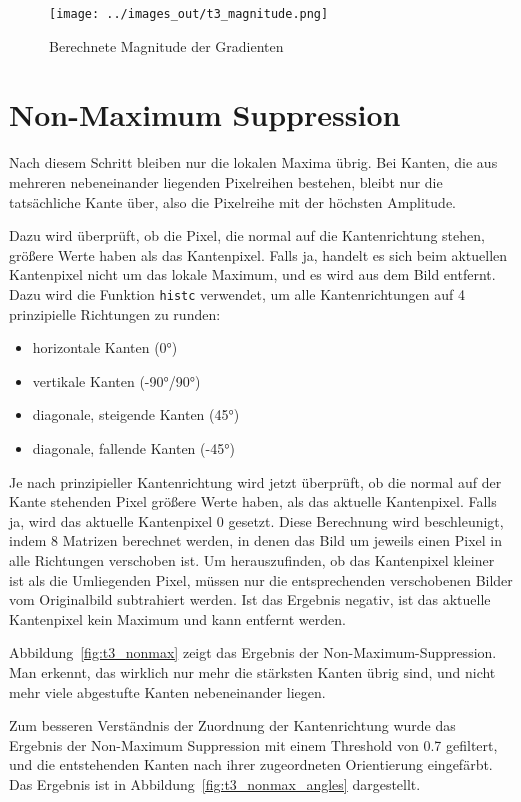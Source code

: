 \begin{figure}[htb]
 \centering
 \texttt{[image: ../images\_out/t3\_magnitude.png]}
 \caption{Berechnete Magnitude der Gradienten}
 \label{fig:t3_magnitude}
\end{figure}

\clearpage

\section{Non-Maximum Suppression}

Nach diesem Schritt bleiben nur die lokalen Maxima übrig. Bei Kanten, die aus mehreren nebeneinander liegenden Pixelreihen bestehen, bleibt nur die tatsächliche Kante über, also die Pixelreihe mit der höchsten Amplitude.

Dazu wird überprüft, ob die Pixel, die normal auf die Kantenrichtung stehen, größere Werte haben als das Kantenpixel. Falls ja, handelt es sich beim aktuellen Kantenpixel nicht um das lokale Maximum, und es wird aus dem Bild entfernt. Dazu wird die Funktion \texttt{histc} verwendet, um alle Kantenrichtungen auf 4 prinzipielle Richtungen zu runden:

\begin{itemize}
 \item horizontale Kanten (0°)
 \item vertikale Kanten (-90°/90°)
 \item diagonale, steigende Kanten (45°)
 \item diagonale, fallende Kanten (-45°)
\end{itemize}

Je nach prinzipieller Kantenrichtung wird jetzt überprüft, ob die normal auf der Kante stehenden Pixel größere Werte haben, als das aktuelle Kantenpixel. Falls ja, wird das aktuelle Kantenpixel 0 gesetzt. Diese Berechnung wird beschleunigt, indem 8 Matrizen berechnet werden, in denen das Bild um jeweils einen Pixel in alle Richtungen verschoben ist. Um herauszufinden, ob das Kantenpixel kleiner ist als die Umliegenden Pixel, müssen nur die entsprechenden verschobenen Bilder vom Originalbild subtrahiert werden. Ist das Ergebnis negativ, ist das aktuelle Kantenpixel kein Maximum und kann entfernt werden.

Abbildung~\ref{fig:t3_nonmax} zeigt das Ergebnis der Non-Maximum-Suppression. Man erkennt, das wirklich nur mehr die stärksten Kanten übrig sind, und nicht mehr viele abgestufte Kanten nebeneinander liegen.

Zum besseren Verständnis der Zuordnung der Kantenrichtung wurde das Ergebnis der Non-Maximum Suppression mit einem Threshold von 0.7 gefiltert, und die entstehenden Kanten nach ihrer zugeordneten Orientierung eingefärbt. Das Ergebnis ist in Abbildung~\ref{fig:t3_nonmax_angles} dargestellt.

